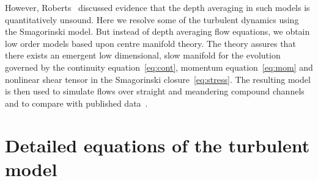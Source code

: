 \documentclass[twocolumn]{afmc_art}
\begin{document}
However, Roberts~\cite{Roberts1996} discussed evidence that the depth averaging in such models is quantitatively unsound.
Here we resolve some of the turbulent dynamics using the Smagorinski model.
But instead of depth averaging flow equations, we obtain low order models based upon centre manifold theory. 
The theory assures that there exists an emergent low dimensional, slow manifold for the evolution governed by the continuity equation~\eqref{eq:cont}, momentum equation~\eqref{eq:mom} and nonlinear shear tensor in the Smagorinski closure~\eqref{eq:stress}.
The resulting model is then used to simulate flows over straight and meandering compound channels and to compare with published data~\cite[e.g.]{Bousmar2002, Liu2009}.


\section{Detailed equations of the turbulent model}
\end{document}
